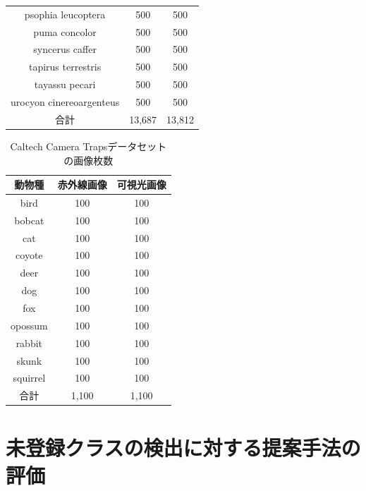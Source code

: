 \documentclass[a4paper,11pt,nomag]{jsreport}
\begin{document}
\begin{table}[tbp]
\begin{tabular}{c|c|c}
      psophia leucoptera       & 500          & 500          \\
      puma concolor            & 500          & 500          \\
      syncerus caffer          & 500          & 500          \\
      tapirus terrestris       & 500          & 500          \\
      tayassu pecari           & 500          & 500          \\
      urocyon cinereoargenteus & 500          & 500          \\ \hline\hline
      合計                      & 13,687       & 13,812       \\ \hline
  \end{tabular}
\end{table}

\begin{table}[tbp]
  \centering
  \caption{Caltech Camera Trapsデータセットの画像枚数}
  \label{tbl:cct}
  \begin{tabular}{c|c|c}
      \hline
      動物種       & 赤外線画像 & 可視光画像 \\ \hline\hline
      bird        & 100      & 100       \\
      bobcat      & 100      & 100       \\
      cat         & 100      & 100       \\
      coyote      & 100      & 100       \\
      deer        & 100      & 100       \\
      dog         & 100      & 100       \\
      fox         & 100      & 100       \\
      opossum     & 100      & 100       \\
      rabbit      & 100      & 100       \\
      skunk       & 100      & 100       \\
      squirrel    & 100      & 100       \\ \hline\hline
      合計         & 1,100    & 1,100     \\ \hline
  \end{tabular}
\end{table}

\section{未登録クラスの検出に対する提案手法の評価}
\label{sec:detect}
\end{document}
